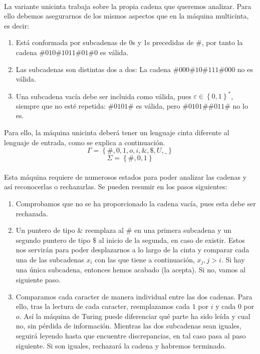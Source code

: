 \documentclass[11pt, a4paper]{exam}
\begin{document}
\begin{questions}
\begin{parts}
        \begin{solution}
            \\
            La variante unicinta trabaja sobre la propia cadena que queremos analizar. Para ello debemos asegurarnos de los mismos aspectos que en la máquina multicinta, es decir:
            \begin{enumerate}
                \item Está conformada por subcadenas de 0s y 1s precedidas de $\#$, por tanto la cadena $\#010\#1011\#01\#0$ es válida.
                \item Las subcadenas son distintas dos a dos: La cadena $\#000\#10\#111\#000$ no es válida.
                \item Una subcadena vacía debe ser incluida como válida, pues $\varepsilon \in \left\lbrace 0, 1 \right\rbrace^*$, siempre que no esté repetida: $\#0101\#$ es válida, pero $\#0101\#\#011\#$ no lo es.
            \end{enumerate}
            Para ello, la máquina unicinta deberá tener un lenguaje cinta diferente al lenguaje de entrada, como se explica a continuación.
            \begin{equation*}
                \Gamma = \left\lbrace \#,0,1,o,i,\&,\$,U,\_ \right\rbrace
            \end{equation*}
            \begin{equation*}
                \Sigma = \left\lbrace \#,0,1 \right\rbrace
            \end{equation*}
            \\
            Esta máquina requiere de numerosos estados para poder analizar las cadenas y así reconocerlas o rechazarlas. Se pueden resumir en los pasos siguientes:
            \begin{enumerate}
                \item Comprobamos que no se ha proporcionado la cadena vacía, pues esta debe ser rechazada.
                \item Un puntero de tipo $\&$ reemplaza al $\#$ en una primera subcadena y un segundo puntero de tipo $\$$ al inicio de la segunda, en caso de existir. Estos nos servirán para poder desplazarnos a lo largo de la cinta y comparar cada una de las subcadenas $x_i$ con las que tiene a continuación, $x_j, j>i$. Si hay una única subcadena, entonces hemos acabado (la acepta). Si no, vamos al siguiente paso.
                \item Comparamos cada caracter de manera individual entre las dos cadenas. Para ello, tras la lectura de cada caracter, reemplazamos cada $1$ por $i$ y cada $0$ por $o$. Así la máquina de Turing puede diferenciar qué parte ha sido leída y cual no, sin pérdida de información. Mientras las dos subcadenas sean iguales, seguirá leyendo hasta que encuentre discrepancias, en tal caso pasa al paso siguiente. Si son iguales, rechazará la cadena y habremos terminado.

\end{enumerate}
\end{solution}
\end{parts}
\end{questions}
\end{document}
